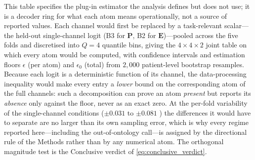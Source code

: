 \begin{flushleft}\footnotesize
This table specifies the plug-in estimator the analysis defines but does
not use; it is a decoder ring for what each atom means operationally,
not a source of reported values. Each channel would first be replaced by
a task-relevant scalar---the held-out single-channel logit (B3 for
$\mathbf{P}$, B2 for $\mathbf{E}$)---pooled across the five folds and
discretised into $Q\!=\!4$ quantile bins, giving the
$4\!\times\!4\!\times\!2$ joint table on which every atom would be
computed, with confidence intervals and estimation floors $\epsilon$ (per
atom) and $\epsilon_0$ (total) from $2{,}000$ patient-level bootstrap
resamples. Because each logit is a deterministic function of its channel,
the data-processing inequality would make every entry a \emph{lower}
bound on the corresponding atom of the full channels: such a
decomposition can prove an atom \emph{present} but reports its
\emph{absence} only against the floor, never as an exact zero. At the
per-fold variability of the single-channel conditions ($\pm 0.031$ to
$\pm 0.081$ \auroc{}) the differences it would have to separate are no
larger than its own sampling error, which is why every regime reported
here---including the out-of-ontology call---is assigned by the
directional rule of the Methods rather than by any numerical atom. The
orthogonal magnitude test is the Conclusive verdict of
\cref{eq:conclusive_verdict}.
\end{flushleft}

